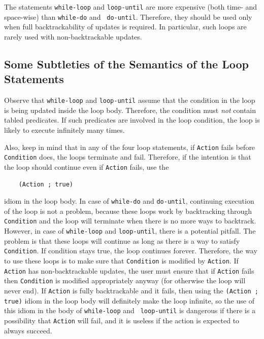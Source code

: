 \documentclass[11pt]{article}
\begin{document}
The statements {\tt while-loop} and {\tt loop-until} are more
expensive (both time- and space-wise) than {\tt while-do} and {\tt
  do-until}. Therefore, they should be used only when full backtrackability
of updates is required. In particular, such loops are rarely used with
non-backtrackable updates.


\subsection{Some Subtleties of the Semantics of the Loop Statements}
\label{sec-updates-pitfalls}

Observe that {\tt while-loop} and {\tt loop-until} assume that the
condition in the loop is being updated inside the loop body.  Therefore,
the condition must \emph{not} contain tabled predicates.  If such
predicates are involved in the loop condition, the loop is likely to
execute infinitely many times.

Also, keep in mind that in any of the four loop statements, if {\tt Action}
fails before {\tt Condition} does, the loops terminate and fail. Therefore,
if the intention is that the loop should continue even if {\tt Action}
fails, use the
\begin{verbatim}
    (Action ; true)  
\end{verbatim}
idiom in the loop body. In case of {\tt while-do} and {\tt do-until},
continuing execution of the loop is not a problem, because these loops work
by backtracking through {\tt Condition} and the loop will terminate when
there is no more ways to backtrack. However, in case of {\tt while-loop}
and {\tt loop-until}, there is a potential pitfall. The problem is that
these loops will continue as long as there is a way to satisfy {\tt
  Condition}.  If condition stays true, the loop continues forever.
Therefore, the way to use these loops is to make sure that {\tt Condition}
is modified by {\tt Action}. If {\tt Action} has non-backtrackable updates,
the user must ensure that if {\tt Action} fails then {\tt Condition} is
modified appropriately anyway (for otherwise the loop will never end).
If {\tt Action} is fully backtrackable and it fails, then using the
{\tt (Action ; true)} idiom in the loop body will definitely make the loop
infinite, so the use of this idiom in the body of {\tt while-loop} and {\tt
  loop-until} is dangerous if there is a possibility that {\tt Action} will
fail, and it is useless if the action is expected to always succeed.
\end{document}
